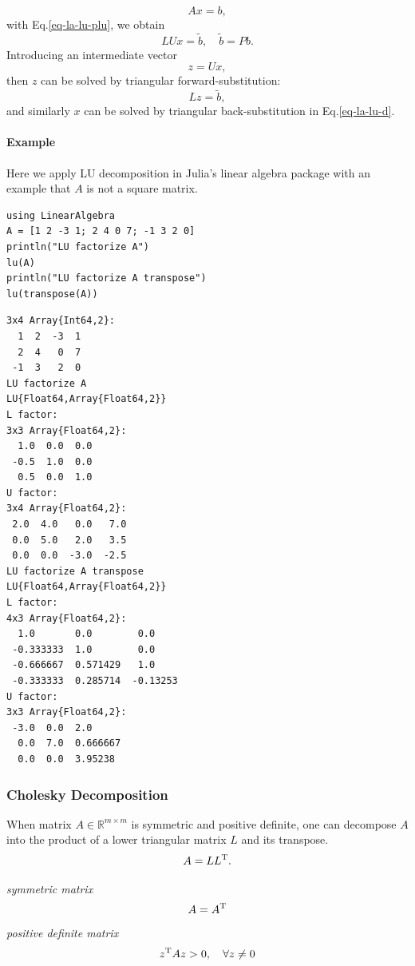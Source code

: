 \documentclass[letterpaper, 11pt]{article}
\providecommand{\nums}[2]{\ensuremath{\mathbb{#1}^{#2}}}
\providecommand{\trans}[1]{\ensuremath{{#1}^{\rm T}}}
\numberwithin{equation}{section}
\begin{document}
\begin{equation}
\label{eq-la-lu-a}
Ax=b,
\end{equation}
with Eq.\ref{eq-la-lu-plu}, we obtain
\begin{equation}
\label{eq-la-lu-b}
LUx=\widetilde{b}, \quad \widetilde{b} = Pb.
\end{equation}
Introducing an intermediate vector
\begin{equation}
\label{eq-la-lu-d}
z=Ux,
\end{equation}
then \(z\) can be solved by triangular forward-substitution:
\begin{equation}
\label{eq-la-lu-c}
Lz=\widetilde{b},
\end{equation}
and similarly \(x\) can be solved by triangular back-substitution in Eq.\ref{eq-la-lu-d}.
\paragraph{Example}
\label{sec:org07fa432}
Here we apply LU decomposition in Julia's linear algebra package with an example that \(A\) is not a square matrix. 
\begin{verbatim}
using LinearAlgebra
A = [1 2 -3 1; 2 4 0 7; -1 3 2 0]
println("LU factorize A")
lu(A)
println("LU factorize A transpose")
lu(transpose(A))
\end{verbatim}

\begin{verbatim}
3x4 Array{Int64,2}:
  1  2  -3  1
  2  4   0  7
 -1  3   2  0
LU factorize A
LU{Float64,Array{Float64,2}}
L factor:
3x3 Array{Float64,2}:
  1.0  0.0  0.0
 -0.5  1.0  0.0
  0.5  0.0  1.0
U factor:
3x4 Array{Float64,2}:
 2.0  4.0   0.0   7.0
 0.0  5.0   2.0   3.5
 0.0  0.0  -3.0  -2.5
LU factorize A transpose
LU{Float64,Array{Float64,2}}
L factor:
4x3 Array{Float64,2}:
  1.0       0.0        0.0    
 -0.333333  1.0        0.0    
 -0.666667  0.571429   1.0    
 -0.333333  0.285714  -0.13253
U factor:
3x3 Array{Float64,2}:
 -3.0  0.0  2.0     
  0.0  7.0  0.666667
  0.0  0.0  3.95238
\end{verbatim}

\subsubsection{Cholesky Decomposition}
\label{sec:org61f4cd8}
When matrix \(A \in \nums{R}{m \times m}\) is symmetric and positive definite, one can decompose \(A\) into the product of a lower triangular matrix \(L\)
and its transpose.
\begin{equation}
\label{eq-la-cholesky}
A = L\trans{L}.
\end{equation}
\begin{margintable}
\textit{\footnotesize symmetric matrix}
\footnotesize{
\[A = \trans{A}\]
}
\textit{\footnotesize positive definite matrix}
\footnotesize{
\[\trans{z}Az > 0, \quad \forall z \not = 0 \]
}
\end{margintable}
\end{document}
